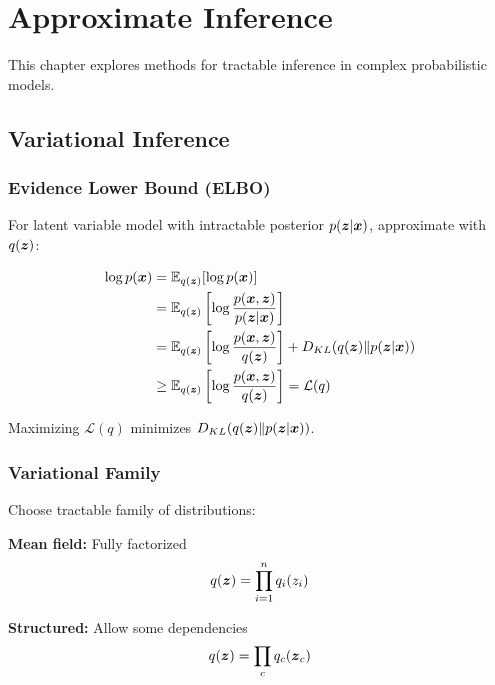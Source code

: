 
\chapter{Approximate Inference}
\label{chap:approximate-inference}

This chapter explores methods for tractable inference in complex probabilistic models.

\section{Variational Inference}
\label{sec:variational-inference}

\subsection{Evidence Lower Bound (ELBO)}

For latent variable model with intractable posterior $p(\boldsymbol{z}|\boldsymbol{x})$, approximate with $q(\boldsymbol{z})$:

\begin{align}
\log p(\boldsymbol{x}) &= \mathbb{E}_{q(\boldsymbol{z})}[\log p(\boldsymbol{x})] \\
&= \mathbb{E}_{q(\boldsymbol{z})}\left[\log \frac{p(\boldsymbol{x}, \boldsymbol{z})}{p(\boldsymbol{z}|\boldsymbol{x})}\right] \\
&= \mathbb{E}_{q(\boldsymbol{z})}\left[\log \frac{p(\boldsymbol{x}, \boldsymbol{z})}{q(\boldsymbol{z})}\right] + D_{KL}(q(\boldsymbol{z}) \| p(\boldsymbol{z}|\boldsymbol{x})) \\
&\geq \mathbb{E}_{q(\boldsymbol{z})}\left[\log \frac{p(\boldsymbol{x}, \boldsymbol{z})}{q(\boldsymbol{z})}\right] = \mathcal{L}(q)
\end{align}

Maximizing $\mathcal{L}(q)$ minimizes $D_{KL}(q(\boldsymbol{z}) \| p(\boldsymbol{z}|\boldsymbol{x}))$.

\subsection{Variational Family}

Choose tractable family of distributions:

\textbf{Mean field:} Fully factorized
\begin{equation}
q(\boldsymbol{z}) = \prod_{i=1}^{n} q_i(z_i)
\end{equation}

\textbf{Structured:} Allow some dependencies
\begin{equation}
q(\boldsymbol{z}) = \prod_{c} q_c(\boldsymbol{z}_c)
\end{equation}

